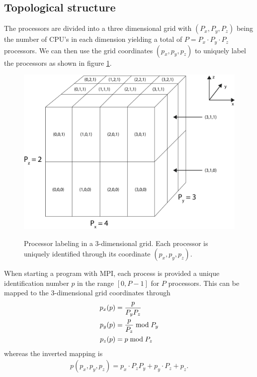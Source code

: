 \subsection{Topological structure}
The processors are divided into a three dimensional grid with $(P_x, P_y, P_z)$ being the number of CPU's in each dimension yielding a total of $P = P_x\cdot P_y\cdot P_z$ processors. We can then use the grid coordinates $(p_x, p_y, p_z)$ to uniquely label the processors as shown in figure \ref{fig:dsmc_parallelization_2}.
\begin{figure}[h]
\begin{center}
\includegraphics[width=\textwidth, trim=0cm 0cm 0cm 0cm, clip]{DSMC/figures/parallelization_node_configuration.eps}
\label{fig:dsmc_parallelization_2}
\end{center}
\caption{Processor labeling in a 3-dimensional grid. Each processor is uniquely identified through its coordinate $(p_x, p_y, p_z)$.}
\end{figure}
When starting a program with MPI, each process is provided a unique identification number $p$ in the range $[0, P-1]$ for $P$ processors. This can be mapped to the 3-dimensional grid coordinates through
\begin{align}
	\nonumber
	p_x(p) &= {p \over P_yP_z}\\
	\nonumber
	p_y(p) &= {p \over P_z} \bmod P_y\\
	p_z(p) &= p \bmod P_z
\end{align}
whereas the inverted mapping is 
\begin{align}
	p(p_x, p_y, p_z) = p_x\cdot P_zP_y + p_y\cdot P_z + p_z.
\end{align}

